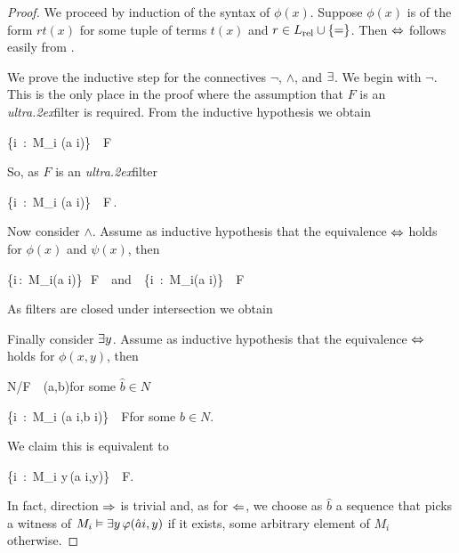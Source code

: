 \documentclass[creche.tex]{subfiles}
\begin{document}
\begin{proof}
We proceed by induction of the syntax of $\phi(x)$. Suppose $\phi(x)$ is of the form $rt(x)$ for some tuple of terms $t(x)$ and $r\in L_{\rm rel}\cup\{=\}$. Then $\Leftrightarrow$ follows easily from .

We prove the inductive step for the connectives $\neg$, $\wedge$, and $\exists$. We begin with $\neg$. This is the only place in the proof where the assumption that $F$ is an \textit{ultra\kern.2ex}filter is required. From the inductive hypothesis we obtain

%
{\IFF}%
{\big\{i\ :\ M_i\; \models\; \phi(\hat a i)\;\big\}\ \notin\ F}

So, as $F$ is an \textit{ultra\kern.2ex}filter

\ceq{}{\IFF}%
{\big\{i\ :\ M_i\; \models\; \neg\phi(\hat a i)\;\big\}\ \in\ F\,.}

Now consider $\wedge$. Assume as inductive hypothesis that the equivalence $\Leftrightarrow$ holds for $\phi(x)$ and $\psi(x)$, then

%
{\IFF}%
{\big\{i\,:\, M_i\models\phi(\hat a i)\big\}\,\in\, F\ \ {\rm and}\ \ \big\{i\, :\, M_i\models\psi(\hat a i)\big\}\, \in\, F}

As filters are closed under intersection we obtain


Finally consider $\exists y$.  Assume as inductive hypothesis that the equivalence $\Leftrightarrow$ holds for $\phi(x,y)$, then

%
{\IFF}%
{N/F\ \pmodels\  \phi\big(\hat a,\hat b\big)}\hfill for some $\hat b\in N$\phantom{.}

\ceq{}{\IFF}%
{\big\{i\ :\ M_i\; \models\; \phi(\hat a i,\hat b i)\;\big\}\ \in\ F}\hfill for some $\hat b\in N$.

We claim this is equivalent to

\ceq{}{\IFF}%
{\big\{i\ :\ M_i\; \models\; \E y\,\phi(\hat a i,y)\;\big\}\ \in\ F.}

In fact, direction $\Rightarrow$ is trivial and, as for $\Leftarrow$, we choose as $\hat b$ a sequence that picks a witness of $M_i\vDash\exists y\,\varphi(\hat a i,y)$ if it exists, some arbitrary element of $M_i$ otherwise.
\end{proof}
\end{document}
